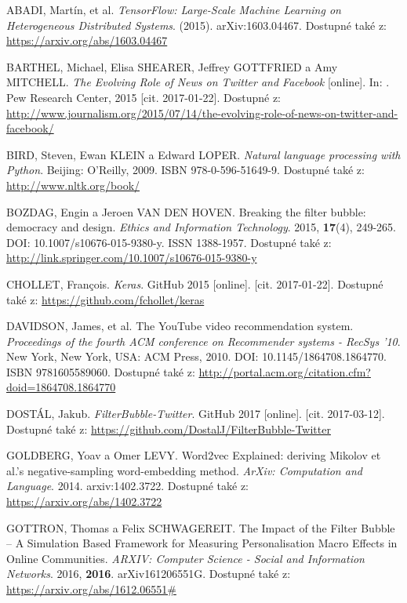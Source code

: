\documentclass[12pt, a4paper]{article}
\numberwithin{equation}{section} 	%
\begin{document}
\newpage
\begin{thebibliography}{99}

    ABADI, Martín, et al. \textit{TensorFlow: Large-Scale Machine Learning on Heterogeneous Distributed Systems}. (2015). arXiv:1603.04467. Dostupné také z: \url{https://arxiv.org/abs/1603.04467}

    BARTHEL, Michael, Elisa SHEARER, Jeffrey GOTTFRIED a Amy MITCHELL. \textit{The Evolving Role of News on Twitter and Facebook} [online]. In: . Pew Research Center, 2015 [cit. 2017-01-22]. Dostupné z: \url{http://www.journalism.org/2015/07/14/the-evolving-role-of-news-on-twitter-and-facebook/}

    BIRD, Steven, Ewan KLEIN a Edward LOPER. \textit{Natural language processing with Python}. Beijing: O'Reilly, 2009. ISBN 978-0-596-51649-9. Dostupné také z: \url{http://www.nltk.org/book/}

    BOZDAG, Engin a Jeroen VAN DEN HOVEN. Breaking the filter bubble: democracy and design. \textit{Ethics and Information Technology}. 2015, \textbf{17}(4), 249-265. DOI: 10.1007/s10676-015-9380-y. ISSN 1388-1957. Dostupné také z: \url{http://link.springer.com/10.1007/s10676-015-9380-y}

    CHOLLET, Fran\c{c}ois. \textit{Keras}. GitHub 2015 [online]. [cit. 2017-01-22]. Dostupné také z: \url{https://github.com/fchollet/keras}

    DAVIDSON, James, et al. The YouTube video recommendation system. \textit{Proceedings of the fourth ACM conference on Recommender systems - RecSys '10}. New York, New York, USA: ACM Press, 2010. DOI: 10.1145/1864708.1864770. ISBN 9781605589060. Dostupné také z: \url{http://portal.acm.org/citation.cfm?doid=1864708.1864770}

    DOSTÁL, Jakub. \textit{FilterBubble-Twitter}. GitHub 2017 [online]. [cit. 2017-03-12]. Dostupné také z: \url{https://github.com/DostalJ/FilterBubble-Twitter}

    GOLDBERG, Yoav a Omer LEVY. Word2vec Explained: deriving Mikolov et al.'s negative-sampling word-embedding method. \textit{ArXiv: Computation and Language}. 2014. arxiv:1402.3722. Dostupné také z: \url{https://arxiv.org/abs/1402.3722}

    GOTTRON, Thomas a Felix SCHWAGEREIT. The Impact of the Filter Bubble -- A Simulation Based Framework for Measuring Personalisation Macro Effects in Online Communities. \textit{ARXIV: Computer Science - Social and Information Networks}. 2016, \textbf{2016}. arXiv161206551G. Dostupné také z: \url{https://arxiv.org/abs/1612.06551\#}


\end{thebibliography}
\end{document}
